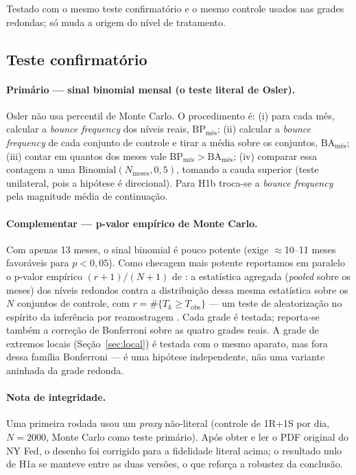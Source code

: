 \documentclass[11pt,a4paper]{article}
\begin{document}
Testado com o mesmo teste confirmatório e o mesmo controle usados nas grades redondas; só
muda a origem do nível de tratamento.

\subsection{Teste confirmatório}

\paragraph{Primário --- sinal binomial mensal (o teste literal de Osler).} Osler não usa
percentil de Monte Carlo. O procedimento é: (i) para cada mês, calcular a \emph{bounce
frequency} dos níveis reais, $\mathrm{BP}_{\text{mês}}$; (ii) calcular a \emph{bounce
frequency} de cada conjunto de controle e tirar a média sobre os conjuntos,
$\mathrm{BA}_{\text{mês}}$; (iii) contar em quantos dos meses vale
$\mathrm{BP}_{\text{mês}} > \mathrm{BA}_{\text{mês}}$; (iv) comparar essa contagem a uma
$\mathrm{Binomial}(N_{\text{meses}}, 0{,}5)$, tomando a cauda superior (teste unilateral, pois
a hipótese é direcional). Para H1b troca-se a \emph{bounce frequency} pela magnitude média de
continuação.

\paragraph{Complementar --- p-valor empírico de Monte Carlo.} Com apenas \num{13} meses, o
sinal binomial é pouco potente (exige $\approx$10--11 meses favoráveis para $p<0{,}05$). Como
checagem mais potente reportamos em paralelo o p-valor empírico $(r+1)/(N+1)$ de
\citet{north2002}: a estatística agregada (\emph{pooled} sobre os meses) dos níveis redondos
contra a distribuição dessa mesma estatística sobre os $N$ conjuntos de controle, com
$r = \#\{T_k \ge T_{\text{obs}}\}$ --- um teste de aleatorização no espírito da
inferência por reamostragem \citep{davison1997}. Cada grade é testada; reporta-se também a correção de
Bonferroni sobre as quatro grades reais. A grade de extremos locais (Seção~\ref{sec:local}) é
testada com o mesmo aparato, mas fora dessa família Bonferroni --- é uma hipótese
independente, não uma variante aninhada da grade redonda.

\paragraph{Nota de integridade.} Uma primeira rodada usou um \emph{proxy} não-literal
(controle de 1R+1S por dia, $N=\num{2000}$, Monte Carlo como teste primário). Após obter e ler
o PDF original do NY Fed, o desenho foi corrigido para a fidelidade literal acima; o resultado
nulo de H1a se manteve entre as duas versões, o que reforça a robustez da conclusão.
\end{document}
